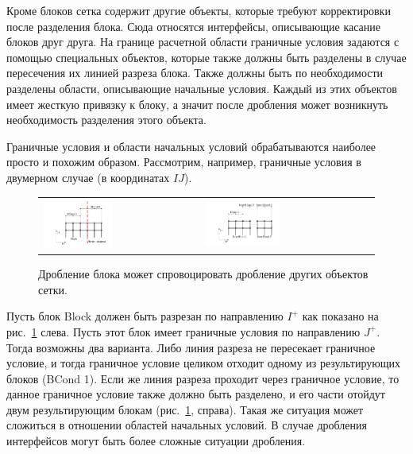 Кроме блоков сетка содержит другие объекты, которые требуют корректировки после разделения блока.
Сюда относятся интерфейсы, описывающие касание блоков друг друга.
На границе расчетной области граничные условия задаются с помощью специальных объектов, которые также должны быть разделены в случае пересечения их линией разреза блока.
Также должны быть по необходимости разделены области, описывающие начальные условия.
Каждый из этих объектов имеет жесткую привязку к блоку, а значит после дробления может возникнуть
необходимость разделения этого объекта.

Граничные условия и области начальных условий обрабатываются наиболее просто и похожим образом.
Рассмотрим, например, граничные условия в двумерном случае (в координатах $IJ$).

\begin{figure}[ht]
\centering
\begin{tabular}{ll}
\includegraphics[width=0.45\textwidth]{fig/par_cut-bcond.pdf}
&
\includegraphics[width=0.45\textwidth]{fig/par_cut-bcond2.pdf}
\end{tabular}
\singlespacing
{}\caption{Дробление блока может спровоцировать дробление других объектов сетки.}
\label{fig:text_2_withcut_cut_bcond}
\end{figure}

Пусть блок Block должен быть разрезан по направлению $I^{+}$ как показано на рис.~\ref{fig:text_2_withcut_cut_bcond} слева.
Пусть этот блок имеет граничные условия по направлению $J^{+}$.
Тогда возможны два варианта.
Либо линия разреза не пересекает граничное условие, и тогда граничное условие целиком отходит одному из результирующих блоков (BCond 1).
Если же линия разреза проходит через граничное условие, то данное граничное условие также должно быть разделено, и его части отойдут двум результирующим блокам (рис.~\ref{fig:text_2_withcut_cut_bcond}, справа).
Такая же ситуация может сложиться в отношении областей начальных условий.
В случае дробления интерфейсов могут быть более сложные ситуации дробления.

